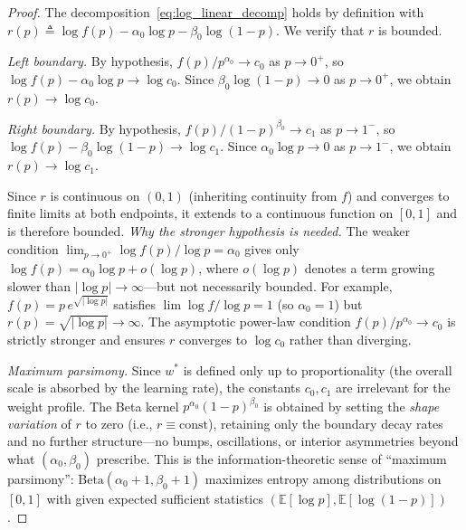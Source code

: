 \documentclass{article}
\begin{document}
\begin{proof}
The decomposition~\eqref{eq:log_linear_decomp} holds by definition with $r(p) \triangleq \log f(p) - \alpha_0 \log p - \beta_0 \log(1-p)$. We verify that $r$ is bounded.

\emph{Left boundary.} By hypothesis, $f(p)/p^{\alpha_0} \to c_0$ as $p \to 0^+$, so $\log f(p) - \alpha_0 \log p \to \log c_0$. Since $\beta_0 \log(1-p) \to 0$ as $p \to 0^+$, we obtain $r(p) \to \log c_0$.

\emph{Right boundary.} By hypothesis, $f(p)/(1-p)^{\beta_0} \to c_1$ as $p \to 1^-$, so $\log f(p) - \beta_0 \log(1-p) \to \log c_1$. Since $\alpha_0 \log p \to 0$ as $p \to 1^-$, we obtain $r(p) \to \log c_1$.

Since $r$ is continuous on $(0,1)$ (inheriting continuity from $f$) and converges to finite limits at both endpoints, it extends to a continuous function on $[0,1]$ and is therefore bounded.
\emph{Why the stronger hypothesis is needed.} The weaker condition $\lim_{p \to 0^+} \log f(p)/\log p = \alpha_0$ gives only $\log f(p) = \alpha_0 \log p + o(\log p)$, where $o(\log p)$ denotes a term growing slower than $|\log p| \to \infty$---but not necessarily bounded. For example, $f(p) = p\,e^{\sqrt{|\!\log p|}}$ satisfies $\lim \log f/\log p = 1$ (so $\alpha_0 = 1$) but $r(p) = \sqrt{|\!\log p|} \to \infty$. The asymptotic power-law condition $f(p)/p^{\alpha_0} \to c_0$ is strictly stronger and ensures $r$ converges to $\log c_0$ rather than diverging.

\emph{Maximum parsimony.} Since $w^*$ is defined only up to proportionality (the overall scale is absorbed by the learning rate), the constants $c_0, c_1$ are irrelevant for the weight profile. The Beta kernel $p^{\alpha_0}(1-p)^{\beta_0}$ is obtained by setting the \emph{shape variation} of $r$ to zero (i.e., $r \equiv \text{const}$), retaining only the boundary decay rates and no further structure---no bumps, oscillations, or interior asymmetries beyond what $(\alpha_0, \beta_0)$ prescribe. This is the information-theoretic sense of ``maximum parsimony'': $\text{Beta}(\alpha_0{+}1, \beta_0{+}1)$ maximizes entropy among distributions on $[0,1]$ with given expected sufficient statistics $(\mathbb{E}[\log p], \mathbb{E}[\log(1{-}p)])$.
\end{proof}
\end{document}
